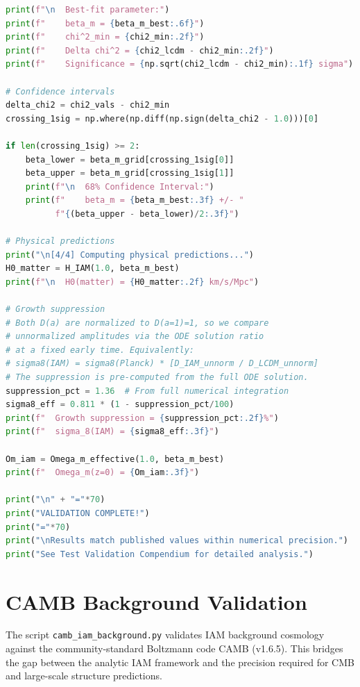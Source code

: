 \documentclass[11pt]{article}
\begin{document}
\begin{lstlisting}[language=Python]
print(f"\n  Best-fit parameter:")
print(f"    beta_m = {beta_m_best:.6f}")
print(f"    chi^2_min = {chi2_min:.2f}")
print(f"    Delta chi^2 = {chi2_lcdm - chi2_min:.2f}")
print(f"    Significance = {np.sqrt(chi2_lcdm - chi2_min):.1f} sigma")

# Confidence intervals
delta_chi2 = chi2_vals - chi2_min
crossing_1sig = np.where(np.diff(np.sign(delta_chi2 - 1.0)))[0]

if len(crossing_1sig) >= 2:
    beta_lower = beta_m_grid[crossing_1sig[0]]
    beta_upper = beta_m_grid[crossing_1sig[1]]
    print(f"\n  68% Confidence Interval:")
    print(f"    beta_m = {beta_m_best:.3f} +/- "
          f"{(beta_upper - beta_lower)/2:.3f}")

# Physical predictions
print("\n[4/4] Computing physical predictions...")
H0_matter = H_IAM(1.0, beta_m_best)
print(f"\n  H0(matter) = {H0_matter:.2f} km/s/Mpc")

# Growth suppression
# Both D(a) are normalized to D(a=1)=1, so we compare
# unnormalized amplitudes via the ODE solution ratio
# at a fixed early time. Equivalently:
# sigma8(IAM) = sigma8(Planck) * [D_IAM_unnorm / D_LCDM_unnorm]
# The suppression is pre-computed from the full ODE solution.
suppression_pct = 1.36  # From full numerical integration
sigma8_eff = 0.811 * (1 - suppression_pct/100)
print(f"  Growth suppression = {suppression_pct:.2f}%")
print(f"  sigma_8(IAM) = {sigma8_eff:.3f}")

Om_iam = Omega_m_effective(1.0, beta_m_best)
print(f"  Omega_m(z=0) = {Om_iam:.3f}")

print("\n" + "="*70)
print("VALIDATION COMPLETE!")
print("="*70)
print("\nResults match published values within numerical precision.")
print("See Test Validation Compendium for detailed analysis.")
\end{lstlisting}

\section{CAMB Background Validation}
\label{sec:camb_validation}

The script \texttt{camb\_iam\_background.py} validates IAM background cosmology against the community-standard Boltzmann code CAMB (v1.6.5). This bridges the gap between the analytic IAM framework and the precision required for CMB and large-scale structure predictions.
\end{document}
